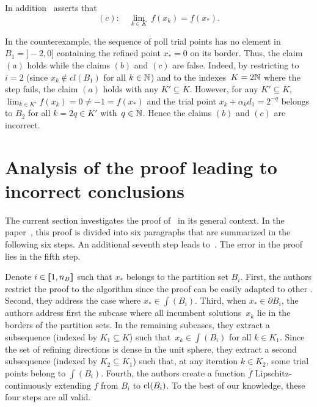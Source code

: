 In addition~\cite[Corollary~4.1]{ViCu2012} asserts that
\begin{equation*}
	(c):\quad \underset{k \in K}{\lim}~ f(x_k) = f(x_*).
\end{equation*}

In the counterexample, the sequence of poll trial points has no element in~$B_1 = {]}-2,0]$ containing the refined point $x_* = 0$ on its border.
Thus, the claim $(a)$ holds while the claims $(b)$ and $(c)$ are false.
Indeed, by restricting to $i = 2$ (since $x_k \notin cl(B_1)$ for all $k \in \mathbb{N}$) and to the indexes~$K = 2\mathbb{N}$ where the \poll step fails, the claim $(a)$ holds with any $K' \subseteq K$.
However, for any $K' \subseteq K$, $\lim_{k \in K'} f(x_k) = 0 \neq -1 = f(x_*)$ and the trial point $x_k+\alpha_kd_1 = 2^{-q}$ belongs to $B_2$ for all $k=2q \in K'$ with~$q \in \mathbb{N}$.
Hence the claims $(b)$ and $(c)$ are incorrect.




\section{Analysis of the proof leading to incorrect conclusions}
\label{sec:problems_proofs}

The current section investigates the proof of~\cite[Theorem~4.1]{ViCu2012} in its general context.
In the paper~\cite{ViCu2012}, this proof is divided into six paragraphs that are summarized in the following six steps. An additional seventh step leads to~\cite[Corollary~4.1]{ViCu2012}.
The error in the proof lies in the fifth step.

Denote $i \in \llbracket 1,n_B \rrbracket$ such that $x_*$ belongs to the partition set $B_i$.
First, the authors restrict the proof to the \mads algorithm since the proof can be easily adapted to other \ddsm.
Second, they address the case where $x_* \in \int(B_i)$.
Third, when $x_* \in \partial B_i$, the authors address first the subcase where all incumbent solutions~$x_k$ lie in the borders of the partition sets.
In the remaining subcases, they extract a subsequence (indexed by $K_1 \subseteq K$) such that~$x_k \in \int(B_i)$ for all $k \in K_1$.
Since the set of refining directions is dense in the unit sphere, they extract a second subsequence (indexed by $K_2 \subseteq K_1$) such that, at any iteration $k \in K_2$, some \poll trial points belong to $\int(B_i)$.
Fourth, the authors create a function $\overline{f}$ Lipschitz-continuously extending $f$ from $B_i$ to $\mathrm{cl}(B_i)$.
To the best of our knowledge, these four steps are all valid.

